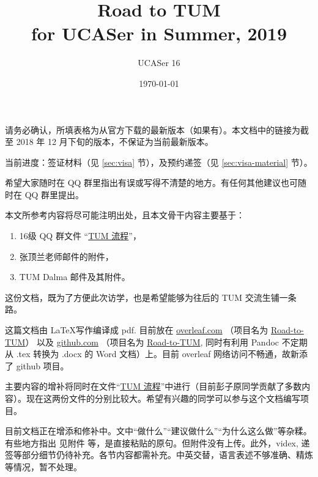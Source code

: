 \documentclass{article}
\title{Road to TUM\\for UCASer in Summer, 2019}
\author{UCASer 16}
\date{\today}
\begin{document}
\maketitle

请务必确认，所填表格为从官方下载的最新版本（如果有）。本文档中的链接为截至 2018 年 12 月下旬的版本，不保证为当前最新版本。

当前进度：签证材料（见 \ref{sec:visa} 节），及预约递签（见 \ref{sec:visa-material} 节）。

希望大家随时在 QQ 群里指出有误或写得不清楚的地方。有任何其他建议也可随时在 QQ 群里提出。

\vfill

本文所参考内容将尽可能注明出处，且本文骨干内容主要基于：
\begin{enumerate}          %
  \item 16级 QQ 群文件 “\href{https://docs.qq.com/doc/DSHd2dlFVZXpodEpq}{TUM 流程}”，
  \item 张顶兰老师邮件的附件，
  \item TUM Dalma 邮件及其附件。
\end{enumerate}

\vfill

这份文档，既为了方便此次访学，也是希望能够为往后的 TUM 交流生铺一条路。

这篇文档由 \LaTeX 写作编译成 pdf. 目前放在 \href{https://www.overlear.com}{overleaf.com} （项目名为 \href{https://www.overleaf.com/2269426218fxwmgyxjywnn}{Road-to-TUM}） 以及 \href{https://github.com}{github.com} （项目名为 \href{https://github.com/Memcys/Road-to-TUM.git}{Road-to-TUM}, 同时有利用 Pandoc 不定期从 .tex 转换为 .docx 的 Word 文档）上。目前 overleaf 网络访问不畅通，故新添了 github 项目。

主要内容的增补将同时在文件“\href{https://docs.qq.com/doc/DSHd2dlFVZXpodEpq}{TUM 流程}”中进行（目前彭子原同学贡献了多数内容）。现在这两份文件的分别比较大。希望有兴趣的同学可以参与这个文档编写项目。

目前文档正在增添和修补中。文中“做什么”“建议做什么”“为什么这么做”等杂糅。有些地方指出 见附件 等，是直接粘贴的原句。但附件没有上传。此外，videx, 递签等部分细节仍待补充。各节内容都需补充。中英交替，语言表述不够准确、精炼等情况，暂不处理。

\newpage
\end{document}
